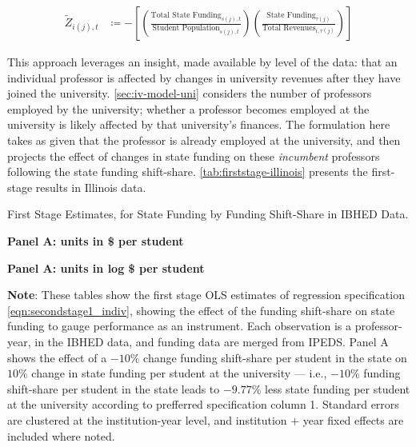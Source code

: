 \begin{align}
    \label{eqn:rolling-instrument}
    \tilde Z_{i(j),t} &\coloneqq - \left[
    \left( \frac{\text{Total State Funding}_{s(j),t}}{\text{Student Population}_{s(j),t}} \right)
    \left( \frac{\text{State Funding}_{\tau(j)}}{\text{Total Revenues}_{i,\tau(j)}} \right) \right]
\end{align}

This approach leverages an insight, made available by level of the data: that an individual professor is affected by changes in university revenues after they have joined the university.
\autoref{sec:iv-model-uni} considers the number of professors employed by the university; whether a professor becomes employed at the university is likely affected by that university's finances.
The formulation here takes as given that the professor is already employed at the university, and then projects the effect of changes in state funding on these \textit{incumbent} professors following the state funding shift-share.
\autoref{tab:firststage-illinois} presents the first-stage results in Illinois data.

\begin{table}[h!]
    \singlespacing
    \centering
    \caption{First Stage Estimates, for State Funding by Funding Shift-Share in IBHED Data.}
    \textbf{Panel A: units in \$ per student}
    
    \makebox[\textwidth][c]{}
    
    \textbf{Panel A: units in log \$ per student}
    
    \makebox[\textwidth][c]{}
    
    \label{tab:firststage-illinois}
    \justify
    \footnotesize
    \textbf{Note}:
    These tables show the first stage OLS estimates of regression specification \eqref{eqn:secondstage1_indiv}, showing the effect of the funding shift-share on state funding to gauge performance as an instrument.
    Each observation is a professor-year, in the IBHED data, and funding data are merged from IPEDS.
    Panel A shows the effect of a $-10$\% change funding shift-share per student in the state on $10$\% change in state funding per student at the university --- i.e.,
    $-10$\% funding shift-share per student in the state leads to $-9.77$\% less state funding per student at the university according to prefferred specification column 1.        
    Standard errors are clustered at the institution-year level, and institution $+$ year fixed effects are included where noted.
\end{table}

